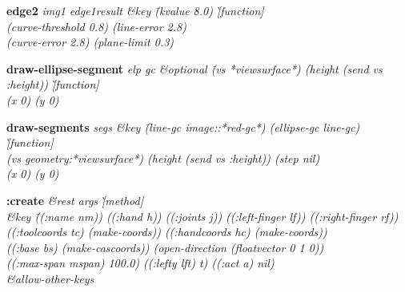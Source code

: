 {\newpage
\clearpage
\samepage 
\begin{emtabbing}{\bf edge2} 
\it img1 edge1result \&key \=(kvalue 8.0) \`[function]\\  
 		\>(curve-threshold 0.8) (line-error 2.8)\\  
                \>(curve-error 2.8) (plane-limit 0.3)
\rm
\end{emtabbing}
}

{\newpage
\clearpage
\samepage 
\begin{emtabbing}{\bf draw-ellipse-segment} 
\it elp gc \&optional \=(vs *viewsurface*)
 (height (send vs :height)) \`[function]\\  
\>(x 0) (y 0)
\rm
\end{emtabbing}
}

{\newpage
\clearpage
\samepage 
\begin{emtabbing}{\bf draw-segments} 
\it segs \&key \=(line-gc image::*red-gc*)
			   (ellipse-gc line-gc) \`[function]\\  
			   \>(vs geometry:*viewsurface*)
			   (height (send vs :height))
			   (step nil)\\  
			   \>(x 0) (y 0)
\rm
\end{emtabbing}
}

{\newpage
\clearpage
\samepage 
\begin{figure}[tb]
\begin{center}

\end{center}
\end{figure}
}

{\newpage
\clearpage
\samepage 
}

{\newpage
\clearpage
\samepage 
\begin{emtabbing}{\bf :create} 
\it \=\&rest args \`[method]\\  
           \>\&key \=((:name nm)) ((:hand h)) ((:joints j))
                ((:left-finger lf)) ((:right-finger rf))\\  
               \>\> ((:toolcoords tc) (make-coords))
                ((:handcoords hc) (make-coords))\\  
                \>\>((:base bs) (make-cascoords))
                (open-direction (floatvector 0 1 0))\\  
                \>\>((:max-span mspan) 100.0)
                ((:lefty lft) t)
                ((:act a) nil)\\  
            \>\&allow-other-keys
\rm
\end{emtabbing}
}

